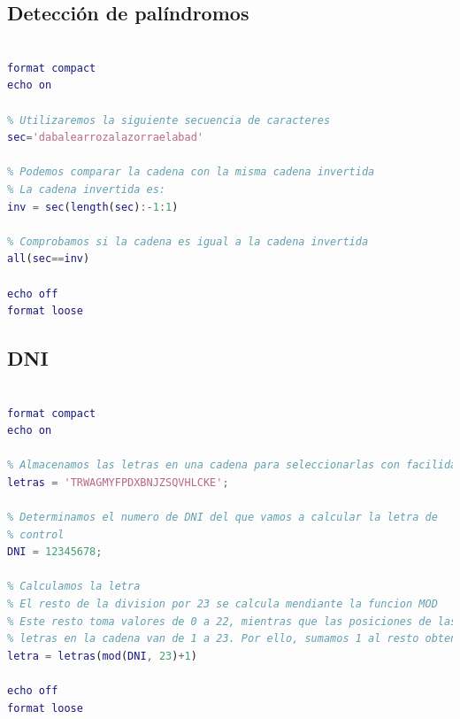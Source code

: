 \subsection{Detección de palíndromos}
\begin{lstlisting}[language=Matlab]
% Ejercicio 12. Deteccion de palindromos

format compact
echo on

% Utilizaremos la siguiente secuencia de caracteres
sec='dabalearrozalazorraelabad'

% Podemos comparar la cadena con la misma cadena invertida
% La cadena invertida es:
inv = sec(length(sec):-1:1)

% Comprobamos si la cadena es igual a la cadena invertida
all(sec==inv)

echo off
format loose
\end{lstlisting}


\subsection{DNI}
\begin{lstlisting}[language=Matlab]
% Ejercicio 13. DNI

format compact
echo on

% Almacenamos las letras en una cadena para seleccionarlas con facilidad
letras = 'TRWAGMYFPDXBNJZSQVHLCKE';

% Determinamos el numero de DNI del que vamos a calcular la letra de
% control
DNI = 12345678;

% Calculamos la letra
% El resto de la division por 23 se calcula mendiante la funcion MOD
% Este resto toma valores de 0 a 22, mientras que las posiciones de las
% letras en la cadena van de 1 a 23. Por ello, sumamos 1 al resto obtenido.
letra = letras(mod(DNI, 23)+1)

echo off
format loose
\end{lstlisting}



